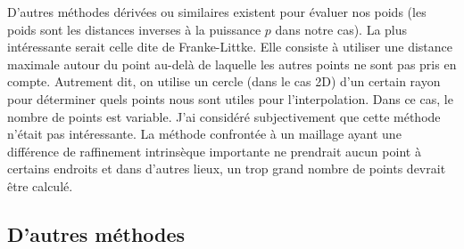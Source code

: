 D'autres méthodes dérivées ou similaires existent pour évaluer nos poids (les poids sont les distances inverses à la puissance \(p\) dans notre cas). La plus intéressante serait celle dite de Franke-Littke. Elle consiste à utiliser une distance maximale autour du point au-delà de laquelle les autres points ne sont pas pris en compte. Autrement dit, on utilise un cercle (dans le cas 2D) d'un certain rayon pour déterminer quels points nous sont utiles pour l'interpolation. Dans ce cas, le nombre de points est variable.
J'ai considéré subjectivement que cette méthode n'était pas intéressante. La méthode confrontée à un maillage ayant une différence de raffinement intrinsèque importante ne prendrait aucun point à certains endroits et dans d'autres lieux, un trop grand nombre de points devrait être calculé.

\vspace{0,5 cm}


\newpage
\subsection{D'autres méthodes}\label{s223}

